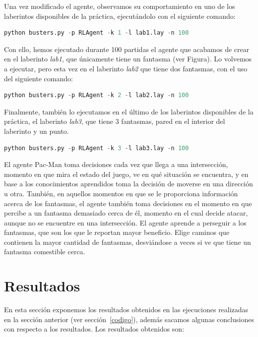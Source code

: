 \documentclass[11pt]{exam}
\begin{document}
Una vez modificado el agente, observamos su comportamiento en uno de los laberintos disponibles de la práctica, ejecutándolo con el siguiente comando:

\begin{lstlisting}[language=python, basicstyle=\footnotesize]
python busters.py -p RLAgent -k 1 -l lab1.lay -n 100
\end{lstlisting}

Con ello, hemos ejecutado durante 100 partidas el agente que acabamos de crear en el laberinto \textit{lab1}, que únicamente tiene un fantasma (ver Figura). Lo volvemos a ejecutar, pero esta vez en el laberinto \textit{lab2} que tiene dos fantasmas, con el uso del siguiente comando:

\begin{lstlisting}[language=python, basicstyle=\footnotesize]
python busters.py -p RLAgent -k 2 -l lab2.lay -n 100
\end{lstlisting}

Finalmente, también lo ejecutamos en el último de los laberintos disponibles de la práctica, el laberinto \textit{lab3}, que tiene 3 fantasmas, pared en el interior del laberinto y un punto.

\begin{lstlisting}[language=python, basicstyle=\footnotesize]
python busters.py -p RLAgent -k 3 -l lab3.lay -n 100
\end{lstlisting}

El agente Pac-Man toma decisiones cada vez que llega a una intersección, momento en que mira el estado del juego, ve en qué situación se encuentra, y en base a los conocimientos aprendidos toma la decisión de moverse en una dirección u otra. También, en aquellos momentos en que se le proporciona información acerca de los fantasmas, el agente también toma decisiones en el momento en que percibe a un fantasma demasiado cerca de él, momento en el cual decide atacar, aunque no se encuentre en una intersección. El agente aprende a perseguir a los fantasmas, que son los que le reportan mayor beneficio. Elige caminos que contienen la mayor cantidad de fantasmas, desviándose a veces si ve que tiene un fantasma comestible cerca.

\section{Resultados}\label{resultados}

En esta sección exponemos los resultados obtenidos en las ejecuciones realizadas en la sección anterior (ver sección~\ref{codigo}), además sacamos algunas conclusiones con respecto a los resultados. Los resultados obtenidos son:
\end{document}

